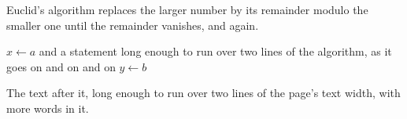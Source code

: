 \documentclass{article}
\begin{document}
Euclid's algorithm replaces the larger number by its remainder modulo the smaller one until the remainder vanishes, and again.
\begin{algorithm}[H]
\caption{Euclid's algorithm with a caption long enough to run over two lines of the float's text width here}
\begin{algorithmic}[1]
\State $x \gets a$ and a statement long enough to run over two lines of the algorithm, as it goes on and on and on
\State $y \gets b$
\end{algorithmic}
\end{algorithm}
The text after it, long enough to run over two lines of the page's text width, with more words in it.
\end{document}

